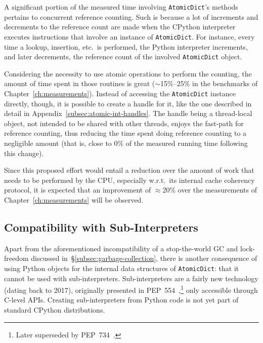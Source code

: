 A significant portion of the measured time involving \texttt{AtomicDict}'s methods pertains to concurrent reference counting.
Such is because a lot of increments and decrements to the reference count are made when the CPython interpreter executes instructions that involve an instance of \texttt{AtomicDict}.
For instance, every time a lookup, insertion, etc.\ is performed, the Python interpreter increments, and later decrements, the reference count of the involved \texttt{AtomicDict} object.

Considering the necessity to use atomic operations to perform the counting, the amount of time spent in those routines is great ($\sim$15\%--25\% in the benchmarks of Chapter~\ref{ch:measurements}).
Instead of accessing the \texttt{AtomicDict} instance directly, though, it is possible to create a handle for it, like the one described in detail in Appendix~\ref{subsec:atomic-int-handles}.
The handle being a thread-local object, not intended to be shared with other threads, enjoys the fast-path for reference counting, thus reducing the time spent doing reference counting to a negligible amount (that is, close to 0\% of the measured running time following this change).

Since this proposed effort would entail a reduction over the amount of work that needs to be performed by the CPU, especially w.r.t.\ its internal cache coherency protocol, it is expected that an improvement of $\approx$20\% over the measurements of Chapter~\ref{ch:measurements} will be observed.


\subsection{Compatibility with Sub-Interpreters}\label{subsec:compatibility-with-sub-interpreters}

Apart from the aforementioned incompatibility of a stop-the-world GC and lock-freedom discussed in~\S\ref{subsec:garbage-collection}, there is another consequence of using Python objects for the internal data structures of \texttt{AtomicDict}: that it cannot be used with sub-interpreters.
Sub-interpreters are a fairly new technology (dating back to 2017), originally presented in PEP~554~\cite{pep554},\footnote{%
    Later superseded by PEP~734~\cite{pep734}.
} only accessible through C-level APIs.
Creating sub-interpreters from Python code is not yet part of standard CPython distributions.

